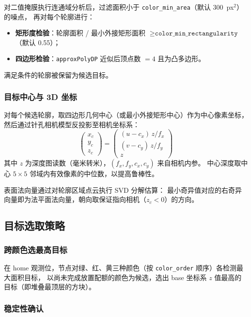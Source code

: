 \documentclass[12pt,a4paper]{article}
\begin{document}
对二值掩膜执行连通域分析后，过滤面积小于 \texttt{color\_min\_area}（默认 300~px$^2$）的噪点，
再对每个轮廓进行：
\begin{itemize}[noitemsep]
  \item \textbf{矩形度检验}：轮廓面积 / 最小外接矩形面积 $\geq \texttt{color\_min\_rectangularity}$（默认 0.55）；
  \item \textbf{四边形检验}：\texttt{approxPolyDP} 近似后顶点数 $=4$ 且为凸多边形。
\end{itemize}
满足条件的轮廓被保留为候选目标。

\subsubsection{目标中心与 3D 坐标}

对每个候选轮廓，取四边形几何中心（或最小外接矩形中心）作为中心像素坐标，
然后通过针孔相机模型反投影至相机坐标系：
\begin{equation}
  \begin{pmatrix} x_c \\ y_c \\ z_c \end{pmatrix}
  = \begin{pmatrix}
      (u - c_x)\,z / f_x \\
      (v - c_y)\,z / f_y \\
      z
    \end{pmatrix}
  \label{eq:backproject}
\end{equation}
其中 $z$ 为深度图读数（毫米转米），$(f_x, f_y, c_x, c_y)$ 来自相机内参。
中心深度取中心 $5\times5$ 邻域内有效像素的中位数，以提高鲁棒性。

表面法向量通过对轮廓区域点云执行 SVD 分解估算：
最小奇异值对应的右奇异向量即为法平面法向量，朝向取保证指向相机（$z_c < 0$）的方向。

\subsection{目标选取策略}

\subsubsection{跨颜色选最高目标}

在 home 观测位，节点对绿、红、黄三种颜色（按 \texttt{color\_order} 顺序）各检测最大面积目标，
以尚未完成放置配额的颜色为候选，选出 base 坐标系 $z$ 值最高的目标（即堆叠最顶层的方块）。

\subsubsection{稳定性确认}
\end{document}
